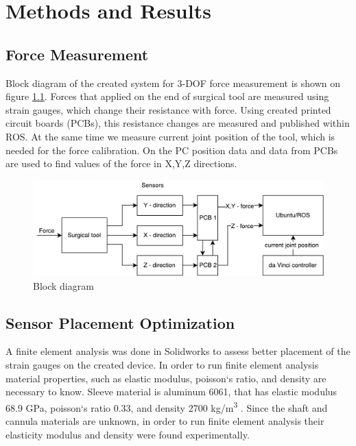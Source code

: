
\chapter{Methods and Results}
\label{methods} %

\section{Force Measurement}
\label{sec:sysArch}
Block diagram of the created system for 3-DOF force measurement is shown on figure \ref{fig:BlockDiag}. Forces that applied on the end of surgical tool are measured using strain gauges, which change their resistance with force. Using created printed circuit boards (PCBs), this resistance changes are measured and published within ROS. At the same time we measure current joint position of the tool, which is needed for the force calibration. On the PC position data and data from PCBs are used to find values of the force in X,Y,Z directions.

\begin{figure}[h]
	\begin{center}
		\includegraphics[width=140mm]{fig/methods/dbd2.pdf}
	\end{center}
	\vspace{-4mm}
	\caption[Block diagram]
	{Block diagram}
	\label{fig:BlockDiag}
	\vspace{-2mm}
\end{figure}

\section{Sensor Placement Optimization}
\label{sec:SimMod}
A finite element analysis was done in Solidworks to assess better placement of the strain gauges on the created device. In order to run finite element analysis material properties, such as elastic modulus, poisson`s ratio, and density are necessary to know. Sleeve material is aluminum 6061, that has elastic modulus 68.9 GPa, poisson`s ratio 0.33, and density 2700 kg/m\textsuperscript{3} \cite{aluminum_properties}. Since the shaft and cannula materials are unknown, in order to run finite element analysis their elasticity modulus and density were found experimentally.
	
